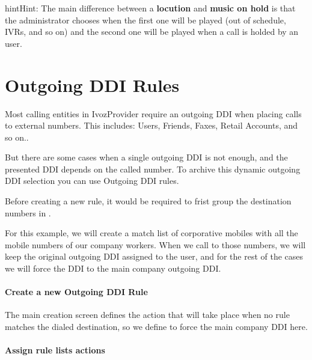 \documentclass[letterpaper,10pt,english]{sphinxmanual}
\begin{document}
\begin{notice}{hint}{Hint:}
The main difference between a \textbf{locution} and \textbf{music on hold} is
that the administrator chooses when the first one will be played (out of
schedule, IVRs, and so on) and the second one will be played when a call is
holded by an user.
\end{notice}


\section{Outgoing DDI Rules}
\label{pbx_features/outgoingddi_rules:outgoing-ddi-rules}\label{pbx_features/outgoingddi_rules:outgoingddi-rules}\label{pbx_features/outgoingddi_rules::doc}
Most calling entities in IvozProvider require an outgoing DDI when placing calls
to external numbers. This includes: Users, Friends, Faxes, Retail Accounts, and
so on..

But there are some cases when a single outgoing DDI is not enough, and the
presented DDI depends on the called number. To archive this dynamic outgoing DDI
selection you can use Outgoing DDI rules.

Before creating a new rule, it would be required to frist group the destination
numbers in {\hyperref[pbx_features/match_lists:match\string-lists]{}}.

For this example, we will create a match list of corporative mobiles with all
the mobile numbers of our company workers. When we call to those numbers, we
will keep the original outgoing DDI assigned to the user, and for the rest of
the cases we will force the DDI to the main company outgoing DDI.
\paragraph{Create a new Outgoing DDI Rule}

The main creation screen defines the action that will take place when no rule
matches the dialed destination, so we define to force the main company DDI here.

\paragraph{Assign rule lists actions}
\end{document}
